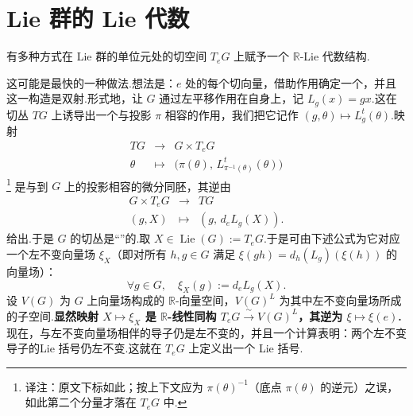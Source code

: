 \section{Lie 群的 Lie 代数}\label{sec:ssl-1-3}

有多种方式在 Lie 群的单位元处的切空间 $T_eG$ 上赋予一个 $\mathbb{R}$-Lie 代数结构.

\begin{numpara}[经由左不变向量场]\label{np:ssl-1-3-1}
这可能是最快的一种做法.想法是：$e$ 处的每个切向量，借助作用确定一个，并且这一构造是双射.形式地，让 $G$ 通过左平移作用在自身上，记 $L_g(x)=gx$.这在切丛 $TG$ 上诱导出一个与投影 $\pi$ 相容的作用，我们把它记作 $(g,\theta)\mapsto L^{t}_{g}(\theta)$.映射
\[
\begin{array}{rcl}
TG &\longrightarrow& G\times T_eG\\
\theta &\longmapsto& \bigl(\pi(\theta),\,L^{t}_{\pi^{-1}(\theta)}(\theta)\bigr)
\end{array}
\]
\footnote{译注：原文下标如此；按上下文应为 $\pi(\theta)^{-1}$（底点 $\pi(\theta)$ 的逆元）之误，如此第二个分量才落在 $T_eG$ 中.}
是与到 $G$ 上的投影相容的微分同胚，其逆由
\[
\begin{array}{rcl}
G\times T_eG &\longrightarrow& TG\\
(g,X) &\longmapsto& (g,\,d_eL_g(X)).
\end{array}
\]
给出.于是 $G$ 的切丛是``''的.取 $X\in\operatorname{Lie}(G):=T_eG$.于是可由下述公式为它对应一个左不变向量场 $\xi_X$（即对所有 $h,g\in G$ 满足 $\xi(gh)=d_h(L_g)(\xi(h))$ 的向量场）：
\[
\forall g\in G,\quad\xi_X(g):=d_eL_g(X).
\]
设 $V(G)$ 为 $G$ 上向量场构成的 $\mathbb{R}$-向量空间，$V(G)^{L}$ 为其中左不变向量场所成的子空间.\textbf{显然映射 $X\mapsto\xi_X$ 是 $\mathbb{R}$-线性同构 $T_eG\xrightarrow{\ \sim\ }V(G)^{L}$，其逆为 $\xi\mapsto\xi(e)$.}现在，与左不变向量场相伴的导子仍是左不变的，并且一个计算表明：两个左不变导子的Lie 括号仍左不变.这就在 $T_eG$ 上定义出一个 Lie 括号.
\end{numpara}

